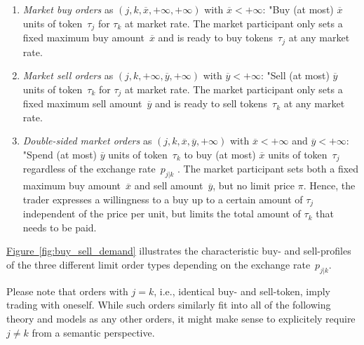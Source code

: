\documentclass[11pt,parskip=full]{scrartcl}%
\newcommand*{\ie}{i.e., }
\newcommand*{\figref}[1]{\hyperref[{#1}]{Figure~\ref*{#1}}}
\begin{document}
\begin{enumerate}
  \item \emph{Market buy orders} as $(j,k,\overline{x},+\infty,+\infty)$
    with $\overline{x} < +\infty$:
  \vspace{.2cm}\newline
  "Buy (at most) $\overline{x}$ units of token~$\tau_j$ for $\tau_k$ at market rate.
  \vspace{.2cm}\newline
  The market participant only sets a fixed maximum buy amount~$\overline{x}$
  and is ready to buy tokens~$\tau_j$ at any market rate.

  \item \emph{Market sell orders} as $(j,k,+\infty,\overline{y},+\infty)$
    with $\overline{y} < +\infty$:
  \vspace{.2cm}\newline
  "Sell (at most) $\overline{y}$ units of token~$\tau_k$ for $\tau_j$ at market rate.
  \vspace{.2cm}\newline
  The market participant only sets a fixed maximum sell amount~$\overline{y}$
  and is ready to sell tokens~$\tau_k$ at any market rate.

  \item \emph{Double-sided market orders} as $(j,k,\overline{x},\overline{y},+\infty)$
    with $\overline{x} < +\infty$ and $\overline{y} < +\infty$:
  \vspace{.2cm}\newline
  "Spend (at most) $\overline{y}$ units of token~$\tau_k$
  to buy (at most) $\overline{x}$ units of token~$\tau_j$
  regardless of the exchange rate~$p_{j|k}$ .
  \vspace{.2cm}\newline
  The market participant sets both a fixed maximum buy amount~$\overline{x}$
  and sell amount~$\overline{y}$, but no limit price $\pi$.
  Hence, the trader expresses a willingness to a buy up to a certain amount of $\tau_j$ independent
  of the price per unit, but limits the total amount of $\tau_k$ that needs to be paid.
\end{enumerate}

\figref{fig:buy_sell_demand} illustrates the characteristic buy- and sell-profiles of the
three different limit order types depending on the exchange rate~$p_{j|k}$.

Please note that orders with $j=k$, \ie identical buy- and sell-token, imply trading with oneself.
While such orders similarly fit into all of the following theory and models as any other orders,
it might make sense to explicitely require $j \neq k$ from a semantic perspective.
\end{document}
